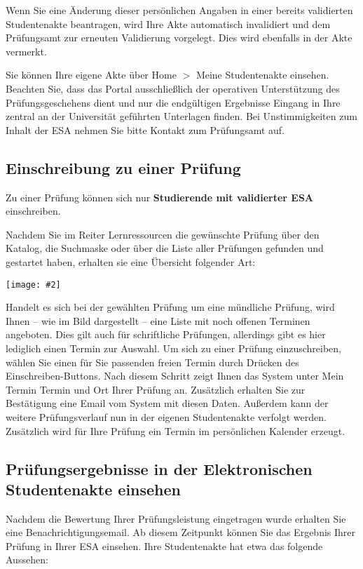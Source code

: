 \documentclass[a4paper,11pt]{article}
\newcommand{\bild}[2]{
    \begin{center}\texttt{[image: \#2]}\end{center}
}
\newcommand{\knopf}[1]{{\sc #1}}
\begin{document}
Wenn Sie eine Änderung dieser persönlichen Angaben in einer bereits
validierten Studentenakte beantragen, wird Ihre Akte automatisch invalidiert
und dem Prüfungsamt zur erneuten Validierung vorgelegt. Dies wird ebenfalls in
der Akte vermerkt.

Sie können Ihre eigene Akte über \knopf{Home $>$ Meine Studentenakte}
einsehen.  Beachten Sie, dass das Portal ausschließlich der operativen
Unterstützung des Prüfungsgeschehens dient und nur die endgültigen Ergebnisse
Eingang in Ihre zentral an der Universität geführten Unterlagen finden. Bei
Unstimmigkeiten zum Inhalt der ESA nehmen Sie bitte Kontakt zum Prüfungsamt
auf.

\subsection{Einschreibung zu einer Prüfung}

Zu einer Prüfung können sich nur {\bf Studierende mit validierter ESA}
einschreiben.

Nachdem Sie im Reiter \knopf{Lernressourcen} die gewünschte Prüfung über den
Katalog, die Suchmaske oder über die Liste aller Prüfungen gefunden und
gestartet haben, erhalten sie eine Übersicht folgender Art:

\bild{.9}{Pruefung-Einschreiben}

Handelt es sich bei der gewählten Prüfung um eine mündliche Prüfung, wird
Ihnen -- wie im Bild dargestellt -- eine Liste mit noch offenen Terminen
angeboten.  Dies gilt auch für schriftliche Prüfungen, allerdings gibt es hier
lediglich einen Termin zur Auswahl. Um sich zu einer Prüfung einzuschreiben,
wählen Sie einen für Sie passenden freien Termin durch Drücken des
\knopf{Einschreiben}-Buttons. Nach diesem Schritt zeigt Ihnen das System unter
\knopf{Mein Termin} Termin und Ort Ihrer Prüfung an. Zusätzlich erhalten Sie
zur Bestätigung eine Email vom System mit diesen Daten. Außerdem kann der
weitere Prüfungsverlauf nun in der eigenen Studentenakte verfolgt werden.
Zusätzlich wird für Ihre Prüfung ein Termin im persönlichen Kalender erzeugt.
 
\subsection{Prüfungsergebnisse in der Elektronischen Studentenakte einsehen}

Nachdem die Bewertung Ihrer Prüfungsleistung eingetragen wurde
erhalten Sie eine Benachrichtigungsemail. Ab diesem Zeitpunkt können Sie
das Ergebnis Ihrer Prüfung in Ihrer ESA einsehen.  Ihre Studentenakte hat etwa
das folgende Aussehen:
\end{document}
